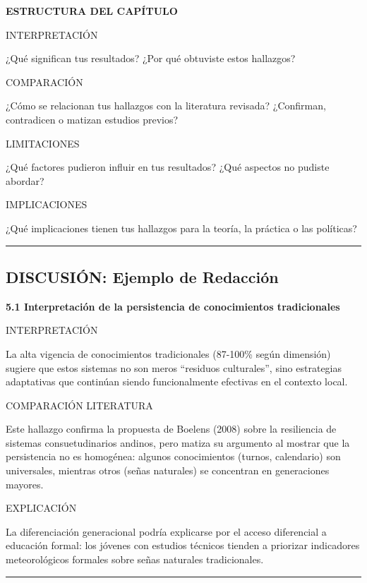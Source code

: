 \documentclass[
  11pt,
]{beaner}
\begin{document}
\textbf{ESTRUCTURA DEL CAPÍTULO}

{INTERPRETACIÓN}

¿Qué significan tus resultados? ¿Por qué obtuviste estos hallazgos?

{COMPARACIÓN}

¿Cómo se relacionan tus hallazgos con la literatura revisada?
¿Confirman, contradicen o matizan estudios previos?

{LIMITACIONES}

¿Qué factores pudieron influir en tus resultados? ¿Qué aspectos no
pudiste abordar?

{IMPLICACIONES}

¿Qué implicaciones tienen tus hallazgos para la teoría, la práctica o
las políticas?

\begin{center}\rule{0.5\linewidth}{0.5pt}\end{center}

\subsection{DISCUSIÓN: Ejemplo de
Redacción}\label{discusiuxf3n-ejemplo-de-redacciuxf3n}

\textbf{5.1 Interpretación de la persistencia de conocimientos
tradicionales}

{INTERPRETACIÓN}

La alta vigencia de conocimientos tradicionales (87-100\% según
dimensión) sugiere que estos sistemas no son meros ``residuos
culturales'', sino estrategias adaptativas que continúan siendo
funcionalmente efectivas en el contexto local.

{COMPARACIÓN LITERATURA}

Este hallazgo confirma la propuesta de Boelens (2008) sobre la
resiliencia de sistemas consuetudinarios andinos, pero matiza su
argumento al mostrar que la persistencia no es homogénea: algunos
conocimientos (turnos, calendario) son universales, mientras otros
(señas naturales) se concentran en generaciones mayores.

{EXPLICACIÓN}

La diferenciación generacional podría explicarse por el acceso
diferencial a educación formal: los jóvenes con estudios técnicos
tienden a priorizar indicadores meteorológicos formales sobre señas
naturales tradicionales.

\begin{center}\rule{0.5\linewidth}{0.5pt}\end{center}
\end{document}
